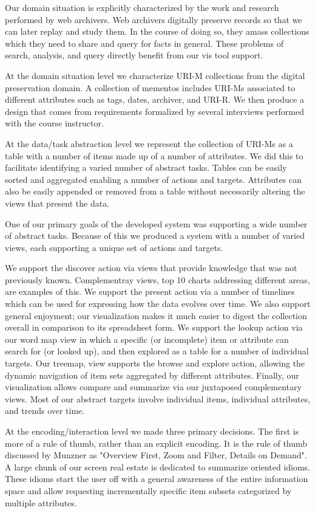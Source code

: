 \documentclass[10pt,journal,compsoc]{IEEEtran}
\begin{document}
Our domain situation is explicitly characterized by the work and research performed by web archivers. 
Web archivers digitally preserve records so that we can later replay and study them. 
In the course of doing so, they amass collections which they need to share and 
query for facts in general. These problems of search, analysis, and query directly 
benefit from our vis tool support. 

At the domain situation level we characterize URI-M collections from the digital preservation domain.
A collection of mementos includes URI-Ms associated to different attributes such as tags, dates, archiver, 
and URI-R. We then produce a design that comes from requirements formalized by several interviews performed 
with the course instructor.

At the data/task abstraction level we represent the collection of URI-Ms as a table
with a number of items made up of a number of attributes. We did this to facilitate 
identifying a varied number of abstract tasks. Tables can be easily sorted and aggregated
enabling a number of actions and targets. Attributes can also be easily appended or removed
from a table without necessarily altering the views that present the data.

One of our primary goals of the developed system was supporting a wide number of abstract tasks. Because of this
we produced a system with a number of varied views, each supporting a unique set of
actions and targets.

We support the discover action via views that provide knowledge that was not previously known.
Complementray views, top 10 charts addressing different areas, are examples of this. We support the present action via a number of timelines 
which can be used for expressing how the data evolves over time. 
We also support general enjoyment; our visualization makes it much easier to digest the
collection overall in comparison to its spreadsheet form. We support the 
lookup action via our word map view in which a specific (or incomplete) item or 
attribute can search for (or looked up), and then explored as a table for a number of individual
targets. Our treemap, view supports the browse and explore action, allowing the dynamic 
navigation of item sets aggregated by different attributes. Finally, our visualization allows 
compare and summarize via our juxtaposed complementary views. Most of our abstract targets
involve individual items, individual attributes, and trends over time.

At the encoding/interaction level we made three primary decisions. The first is 
more of a rule of thumb, rather than an explicit encoding. It is the rule of thumb 
discussed by Munzner as "Overview First, Zoom and Filter, Details on Demand". 
A large chunk of our screen real estate is dedicated to summarize oriented idioms. 
These idioms start the user off with a general awareness of the entire information space
and allow requesting incrementally specific item subsets categorized by multiple attributes.
\end{document}
